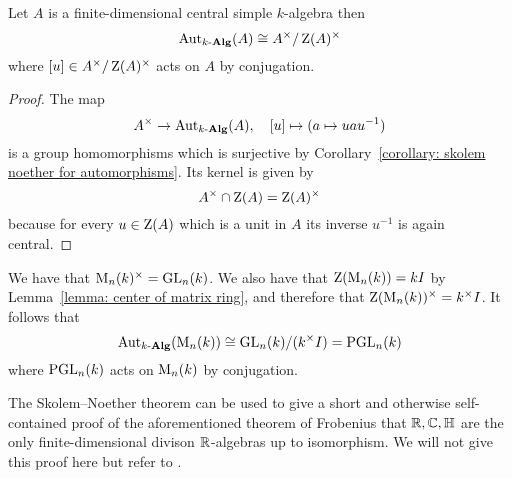 \begin{corollary}
  Let $A$ is a finite-dimensional central simple $k$-algebra then
  \[
          \operatorname{Aut}_{k\text{-}\mathbf{Alg}}(A)
    \cong A^\times / \operatorname{Z}(A)^\times
  \]
  where $[u] \in A^\times / \operatorname{Z}(A)^\times$ acts on $A$ by conjugation.
\end{corollary}


\begin{proof}
  The map
  \[
            A^\times
    \to     \operatorname{Aut}_{k\text{-}\mathbf{Alg}}(A),
    \quad   [u]
    \mapsto (a \mapsto u a u^{-1})
  \]
  is a group homomorphisms which is surjective by Corollary~\ref{corollary: skolem noether for automorphisms}.
  Its kernel is given by
  \[
      A^\times \cap \operatorname{Z}(A)
    = \operatorname{Z}(A)^\times
  \]
  because for every $u \in \operatorname{Z}(A)$ which is a unit in $A$ its inverse $u^{-1}$ is again central.
\end{proof}


\begin{example}
  We have that $\operatorname{M}_n(k)^\times = \operatorname{GL}_n(k)$.
  We also have that $\operatorname{Z}(\operatorname{M}_n(k)) = k I$ by Lemma~\ref{lemma: center of matrix ring}, and therefore that $\operatorname{Z}(\operatorname{M}_n(k))^\times = k^\times I$.
  It follows that
  \[
          \operatorname{Aut}_{k\text{-}\mathbf{Alg}}(\operatorname{M}_n(k))
    \cong \operatorname{GL}_n(k) / (k^\times I)
    =     \operatorname{PGL}_n(k)
  \]
  where $\operatorname{PGL}_n(k)$ acts on $\operatorname{M}_n(k)$ by conjugation.
\end{example}


\begin{remark}
  The Skolem--Noether theorem can be used to give a short and otherwise self-contained proof of the aforementioned theorem of Frobenius that $\mathbb{R}, \mathbb{C}, \mathbb{H}$ are the only finite-dimensional divison $\mathbb{R}$-algebras up to isomorphism.
  We will not give this proof here but refer to \cite[Theorem 2.50]{Knapp2016Advanced}.
\end{remark}



